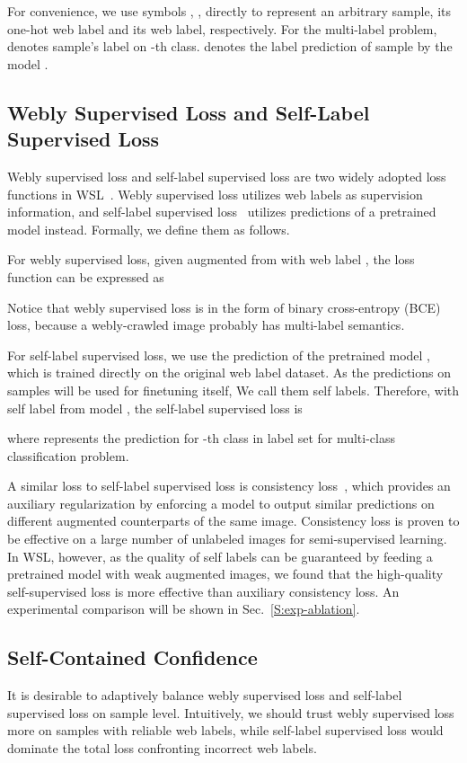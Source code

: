 \documentclass[runningheads]{llncs}
\begin{document}
For convenience, we use symbols , ,  directly to represent an arbitrary sample, its one-hot web label and its web label, respectively. For the multi-label problem,  denotes sample's label on -th class.
 denotes the label prediction of sample  by the model .
	
\subsection{Webly Supervised Loss and Self-Label Supervised Loss}
\label{S:method-loss}
Webly supervised loss and self-label supervised loss are two widely adopted loss functions in WSL~\cite{guo2018curriculumnet,han2019deep,reed2014bootstrap,tanaka2018joint}. 
Webly supervised loss utilizes web labels as supervision information, and self-label supervised loss~\cite{han2019deep,tanaka2018joint} utilizes predictions of a pretrained model instead. Formally, we define them as follows.

For webly supervised loss, given  augmented from  with web label , the loss function can be expressed as

Notice that webly supervised loss is in the form of binary cross-entropy (BCE) loss, because a webly-crawled image probably has multi-label semantics.

For self-label supervised loss, we use the prediction of the pretrained model , which is trained directly on the original web label dataset. As the predictions on samples will be used for finetuning  itself, We call them self labels.  Therefore, with self label  from model , the self-label supervised loss is 

where  represents the prediction for -th class in label set  for multi-class classification problem.

A similar loss to self-label supervised loss is consistency loss~\cite{berthelot2019mixmatch,xie2019unsupervised}, which provides an auxiliary regularization by enforcing a model to output similar predictions on different augmented counterparts of the same image. Consistency loss is proven to be effective on a large number of unlabeled images for semi-supervised learning. In WSL, however, as the quality of self labels can be guaranteed by feeding a pretrained model with weak augmented images, we found that the high-quality self-supervised loss is more effective than auxiliary consistency loss. An experimental comparison will be shown in Sec.~\ref{S:exp-ablation}.

\subsection{Self-Contained Confidence}
\label{S:method-conf}
It is desirable to adaptively balance webly supervised loss and self-label supervised loss on sample level. Intuitively, we should trust webly supervised loss more on samples with reliable web labels, while self-label supervised loss would dominate the total loss confronting incorrect web labels. 
\end{document}
